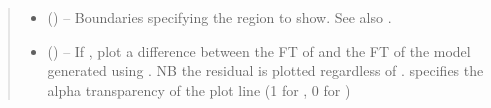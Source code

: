 \documentclass[letterpaper,10pt,english]{sphinxmanual}
\begin{document}
\begin{fulllineitems}
\begin{quote}
\begin{description}
\begin{itemize}
\item {} 
\sphinxAtStartPar
{} (\sphinxstyleliteralemphasis{\sphinxupquote{{[}}}\sphinxstyleliteralemphasis{\sphinxupquote{{[}}}\sphinxstyleliteralemphasis{\sphinxupquote{, }}\sphinxstyleliteralemphasis{\sphinxupquote{{]}}}\sphinxstyleliteralemphasis{\sphinxupquote{{]}}}\sphinxstyleliteralemphasis{\sphinxupquote{, }}\sphinxstyleliteralemphasis{\sphinxupquote{{[}}}\sphinxstyleliteralemphasis{\sphinxupquote{{[}}}\sphinxstyleliteralemphasis{\sphinxupquote{, }}\sphinxstyleliteralemphasis{\sphinxupquote{{]}}}\sphinxstyleliteralemphasis{\sphinxupquote{{]}}}\sphinxstyleliteralemphasis{\sphinxupquote{, }}\sphinxstyleliteralemphasis{\sphinxupquote{{[}}}\sphinxstyleliteralemphasis{\sphinxupquote{{[}}}\sphinxstyleliteralemphasis{\sphinxupquote{, }}\sphinxstyleliteralemphasis{\sphinxupquote{{]}}}\sphinxstyleliteralemphasis{\sphinxupquote{, }}\sphinxstyleliteralemphasis{\sphinxupquote{{[}}}\sphinxstyleliteralemphasis{\sphinxupquote{, }}\sphinxstyleliteralemphasis{\sphinxupquote{{]}}}\sphinxstyleliteralemphasis{\sphinxupquote{{]} or     }}\sphinxstyleliteralemphasis{\sphinxupquote{{[}}}\sphinxstyleliteralemphasis{\sphinxupquote{{[}}}\sphinxstyleliteralemphasis{\sphinxupquote{, }}\sphinxstyleliteralemphasis{\sphinxupquote{{]}}}\sphinxstyleliteralemphasis{\sphinxupquote{, }}\sphinxstyleliteralemphasis{\sphinxupquote{{[}}}\sphinxstyleliteralemphasis{\sphinxupquote{, }}\sphinxstyleliteralemphasis{\sphinxupquote{{]}}}\sphinxstyleliteralemphasis{\sphinxupquote{{]}}}) – Boundaries specifying the region to show. See also
{\hyperref[\detokenize{references/freqfilter:nmrespy.freqfilter.FrequencyFilter}]{}}.

\item {} 
\sphinxAtStartPar
{} (\sphinxstyleliteralemphasis{\sphinxupquote{, }}) – If , plot a difference between the FT of  and the FT of
the model generated using . NB the residual is plotted
regardless of .  specifies the alpha
transparency of the plot line (1 for , 0 for )


\end{itemize}
\end{description}
\end{quote}
\end{fulllineitems}
\end{document}
